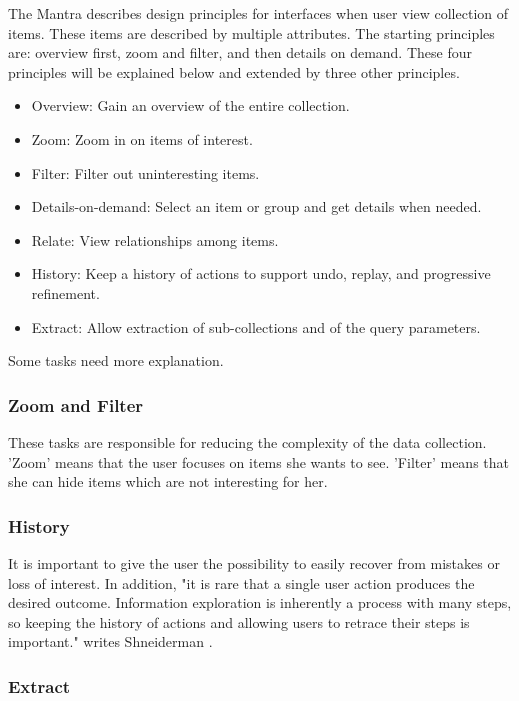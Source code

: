 \documentclass[11pt]{report}
\begin{document}
The Mantra describes design principles for interfaces when user view collection of items. These items are described by multiple attributes. The starting principles are: overview first, zoom and filter, and then details on demand. These four principles will be explained below and extended by three other principles.
\begin{itemize}
	\item Overview: Gain an overview of the entire collection.
	\item Zoom: Zoom in on items of interest.
	\item Filter: Filter out uninteresting items.
	\item Details-on-demand: Select an item or group and get details when needed.
	\item Relate: View relationships among items.
	\item History: Keep a history of actions to support undo, replay, and progressive refinement.
	\item Extract: Allow extraction of sub-collections and of the query parameters.
\end{itemize}

Some tasks need more explanation.

\subsubsection{Zoom and Filter}

These tasks are responsible for reducing the complexity of the data collection. 'Zoom' means that the user focuses on items she wants to see. 'Filter' means that she can hide items which are not interesting for her.

\subsubsection{History}

It is important to give the user the possibility to easily recover from mistakes or loss of interest. In addition, "it is rare that a single user action produces the desired outcome. Information exploration is inherently a process with many steps, so keeping the history of actions and allowing users to retrace their steps is important." writes Shneiderman \cite{Shneiderman1996}.

\subsubsection{Extract}
\end{document}
